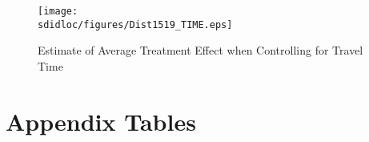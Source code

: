 \begin{figure}[htpb!]
\caption{Estimate of Average Treatment Effect when Controlling for Travel Time}
\label{Sfig:ATTTime}
\vspace{-8mm}
\texttt{[image: \\sdidloc/figures/Dist1519\_TIME.eps]}
\end{figure}

\newpage
\section{Appendix Tables}
\label{Sscn:Atables}






%



